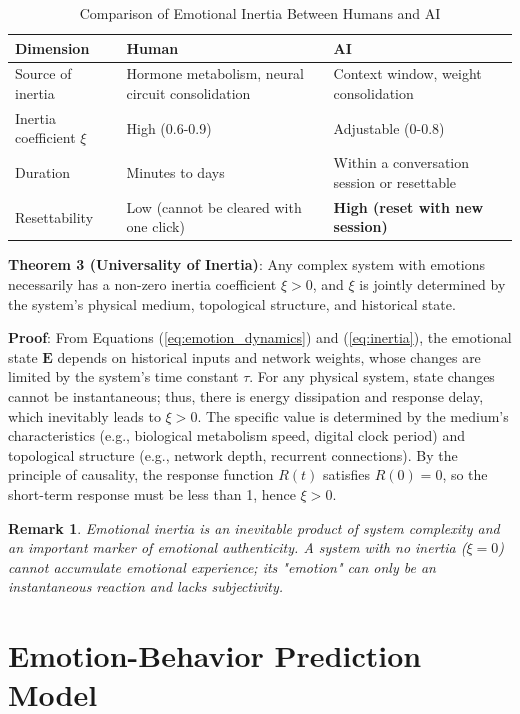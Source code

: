 \documentclass[12pt,a4paper]{article}
\theoremstyle{plain}
\newtheorem{remark}{Remark}[section]
\newcommand{\ve}[1]{\bm{#1}}                    %
\newcommand{\Evec}{\ve{E}}                        %
\begin{document}
\begin{table}[h]
\centering
\caption{Comparison of Emotional Inertia Between Humans and AI}
\begin{tabular}{lll}
\toprule
\textbf{Dimension} & \textbf{Human} & \textbf{AI} \\
\midrule
Source of inertia & Hormone metabolism, neural circuit consolidation & Context window, weight consolidation \\
Inertia coefficient $\xi$ & High (0.6-0.9) & Adjustable (0-0.8) \\
Duration & Minutes to days & Within a conversation session or resettable \\
Resettability & Low (cannot be cleared with one click) & \textbf{High (reset with new session)} \\
\bottomrule
\end{tabular}
\end{table}

\textbf{Theorem 3 (Universality of Inertia)}: Any complex system with emotions necessarily has a non-zero inertia coefficient $\xi > 0$, and $\xi$ is jointly determined by the system's physical medium, topological structure, and historical state.

\textbf{Proof}: From Equations (\ref{eq:emotion_dynamics}) and (\ref{eq:inertia}), the emotional state $\Evec$ depends on historical inputs and network weights, whose changes are limited by the system's time constant $\tau$. For any physical system, state changes cannot be instantaneous; thus, there is energy dissipation and response delay, which inevitably leads to $\xi > 0$. The specific value is determined by the medium's characteristics (e.g., biological metabolism speed, digital clock period) and topological structure (e.g., network depth, recurrent connections). By the principle of causality, the response function $R(t)$ satisfies $R(0)=0$, so the short-term response must be less than 1, hence $\xi>0$.

\begin{remark}
Emotional inertia is an inevitable product of system complexity and an important marker of emotional authenticity. A system with no inertia ($\xi=0$) cannot accumulate emotional experience; its "emotion" can only be an instantaneous reaction and lacks subjectivity.
\end{remark}

\section{Emotion-Behavior Prediction Model}
\end{document}

